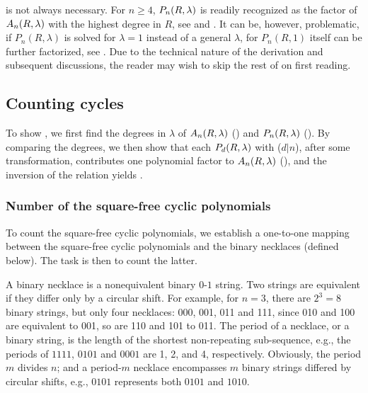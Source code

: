 \documentclass[preprint]{revtex4-1}
\begin{document}
 is not always necessary.
For $n \ge 4$,
  $P_n(R, \lambda)$ is readily recognized as
  the factor
  of $A_n(R, \lambda)$
  with the highest degree in $R$,
  see  and .
It can be, however, problematic,
   if $P_n(R, \lambda)$ is solved for $\lambda = 1$
   instead of a general $\lambda$,
   for $P_n(R, 1)$ itself can be further factorized,
  see .
%
Due to the technical nature of the derivation and subsequent discussions,
  the reader may wish to skip the rest of 
  on first reading.






\subsection{\label{sec:degprimfac}Counting cycles}


To show , we first find the degrees in $\lambda$ of
  $A_n(R, \lambda)$ () and $P_n(R, \lambda)$ ().
By comparing the degrees,
  we then show that each $P_d(R, \lambda)$ with ($d|n$),
  after some transformation,
  contributes one polynomial factor to $A_n(R, \lambda)$
  (),
  and the inversion of the relation
  yields .


\subsubsection{Number of the square-free cyclic polynomials}

To count the square-free cyclic polynomials,
  we establish a one-to-one mapping
  between the square-free cyclic polynomials
  and the binary necklaces (defined below).
The task is then to count the latter.

A binary necklace
  is a nonequivalent binary $0$-$1$ string.
%
Two strings are equivalent if they differ only by a circular shift.
%
For example, for $n = 3$, there are $2^3 = 8$ binary strings,
but only four necklaces: 000, 001, 011 and 111,
since 010 and 100 are equivalent to 001,
so are 110 and 101 to 011.
%
The period of a necklace, or a binary string,
  is the length of the shortest non-repeating sub-sequence,
  e.g., the periods of $1111$, $0101$ and $0001$
        are 1, 2, and 4, respectively.
%
Obviously, the period $m$ divides $n$;
  and a period-$m$ necklace
  encompasses $m$ binary strings
  differed by circular shifts,
  e.g., $0101$ represents
  both $0101$ and $1010$.
\end{document}
